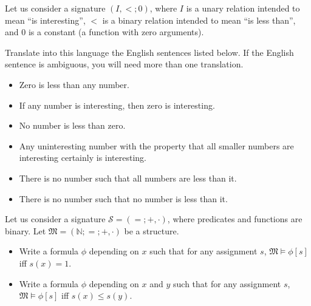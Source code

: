 \documentclass[addpoints]{exam}
\begin{document}
  \pagestyle{headandfoot}
  \runningheadrule

  \firstpagefooter{}{}{}
  \runningfooter{}{}{}
  \begin{flushright}

    \vspace{0.2in}
  \end{flushright}

  \begin{questions}
    \question[10]
      Let us consider a signature $(I, <; 0)$, where $I$ is a unary relation
			intended to mean ``is interesting'', $<$ is a binary relation
			intended to mean ``is less than'', and $0$ is a constant (a function with
			zero arguments).
			
			Translate into this language the English sentences listed below.
			If the English sentence is ambiguous, you will need more than one translation.
			\begin{itemize}
			    \item Zero is less than any number.
			    \item If any number is interesting, then zero is interesting.
			    \item No number is less than zero.
			    \item Any uninteresting number with the property that all
			        smaller numbers are interesting certainly is interesting.
			    \item There is no number such that all numbers are less than it.
			    \item There is no number such that no number is less than it.
			\end{itemize}

      \begin{solution}[\stretch{1}]
      \end{solution}
      \newpage
    \question[10]
      Let us consider a signature $\mathcal{S} = (=; +, \cdot)$, where predicates and
			functions are binary.  Let $\mathfrak{M} = (\mathbb{N}; =; +, \cdot)$ be a
			structure.
			
			\begin{itemize}
			    \item Write a formula $\phi$ depending on $x$ such that for any assignment
			        $s$, $\mathfrak{M} \models \phi[s]$ iff $s(x) = 1$.
			    \item Write a formula $\phi$ depending on $x$ and $y$ such that for any
			        assignment $s$, $\mathfrak{M} \models \phi[s]$ iff $s(x) \le s(y)$.
			\end{itemize}

      \begin{solution}[\stretch{1}]
      \end{solution}
      \newpage
  \end{questions}
\end{document}
